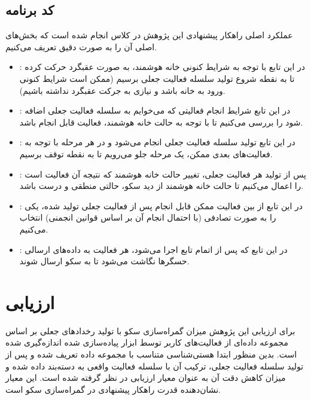 \subsection{کد برنامه}

عملکرد اصلی راهکار پیشنهادی این پژوهش در کلاس  انجام شده است که بخش‌های اصلی آن را به صورت دقیق تعریف می‌کنیم.

\begin{itemize}
\item \textbf{}: در این تابع با توجه به شرایط کنونی خانه هوشمند، به صورت عقبگرد حرکت کرده تا به نقطه شروع تولید سلسله فعالیت جعلی برسیم (ممکن است شرایط کنونی ورود به خانه باشد و نیازی به جرکت عقبگرد نداشته باشیم).
\item \textbf{}: در این تابع شرایط انجام فعالیتی که می‌خوایم به سلسله فعالیت جعلی اضافه شود را بررسی می‌کنیم تا با توجه به حالت خانه هوشمند، فعالیت قابل انجام باشد.
\item \textbf{}: در این تابع تولید سلسله فعالیت جعلی انجام می‌شود و در هر مرحله با توجه به فعالیت‌های بعدی ممکن، یک مرحله جلو می‌رویم تا به نقطه‌ توقف برسیم.
\item \textbf{}: پس از تولید هر فعالیت جعلی، تغییر حالت خانه هوشمند که نتیجه آن فعالیت است را اعمال می‌کنیم تا حالت خانه هوشمند از دید سکو، حالتی منطقی و درست باشد.
\item \textbf{}: در این تابع از بین فعالیت ممکن قابل انجام پس از فعالیت جعلی تولید شده، یکی را به صورت تصادفی (با احتمال انجام آن بر اساس قوانین انجمنی) انتخاب می‌کنیم.
\item \textbf{}: در این تابع که پس از اتمام تابع  اجرا می‌شود، هر فعالیت به داده‌های ارسالی حسگرها نگاشت می‌شود تا به سکو ارسال شوند.
\end{itemize}

\section{ارزیابی}

برای ارزیابی این پژوهش میزان گمراه‌سازی سکو با تولید رخدادهای جعلی بر اساس مجموعه داده‌ای از فعالیت‌های کاربر توسط ابزار پیاده‌سازی شده اندازه‌گیری شده است. بدین منظور ابتدا هستی‌شناسی متناسب با مجموعه داده تعریف شده و پس از تولید سلسله فعالیت جعلی، ترکیب آن با سلسله فعالیت واقعی به دسته‌بند داده شده و میزان کاهش دقت آن به عنوان معیار ارزیابی در نظر گرفته شده است. این معیار نشان‌دهنده‌ قدرت راهکار پیشنهادی در گمراه‌سازی سکو است.

